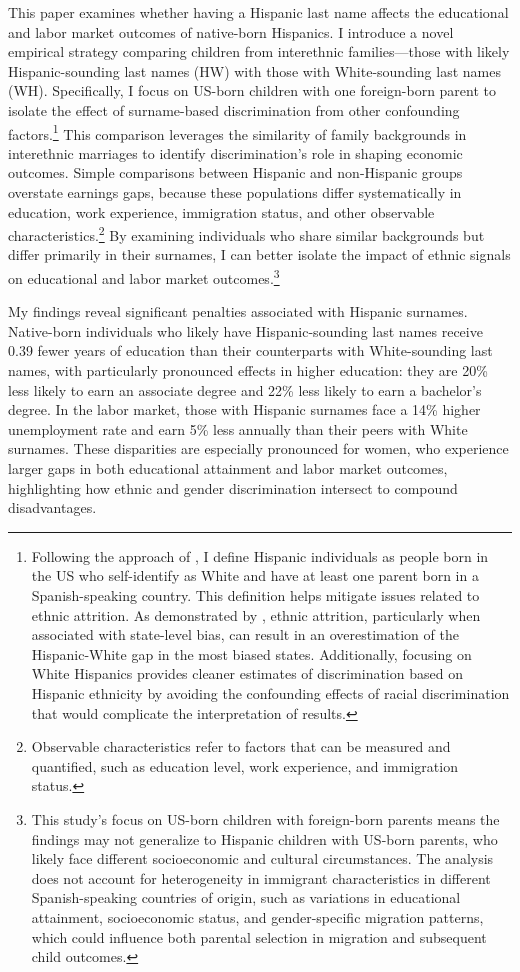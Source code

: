This paper examines whether having a Hispanic last name affects the educational and labor market outcomes of native-born Hispanics. I introduce a novel empirical strategy comparing children from interethnic families—those with likely Hispanic-sounding last names (HW) with those with White-sounding last names (WH). Specifically, I focus on US-born children with one foreign-born parent to isolate the effect of surname-based discrimination from other confounding factors.\footnote{Following the approach of \textcite{antman2020ethnic, hadah2024effect}, I define Hispanic individuals as people born in the US who self-identify as White and have at least one parent born in a Spanish-speaking country. This definition helps mitigate issues related to ethnic attrition. As demonstrated by \textcite{hadah2024effect}, ethnic attrition, particularly when associated with state-level bias, can result in an overestimation of the Hispanic-White gap in the most biased states. Additionally, focusing on White Hispanics provides cleaner estimates of discrimination based on Hispanic ethnicity by avoiding the confounding effects of racial discrimination that would complicate the interpretation of results.} This comparison leverages the similarity of family backgrounds in interethnic marriages to identify discrimination's role in shaping economic outcomes. Simple comparisons between Hispanic and non-Hispanic groups overstate earnings gaps, because these populations differ systematically in education, work experience, immigration status, and other observable characteristics.\footnote{Observable characteristics refer to factors that can be measured and quantified, such as education level, work experience, and immigration status.} By examining individuals who share similar backgrounds but differ primarily in their surnames, I can better isolate the impact of ethnic signals on educational and labor market outcomes.\footnote{This study's focus on US-born children with foreign-born parents means the findings may not generalize to Hispanic children with US-born parents, who likely face different socioeconomic and cultural circumstances. The analysis does not account for heterogeneity in immigrant characteristics in different Spanish-speaking countries of origin, such as variations in educational attainment, socioeconomic status, and gender-specific migration patterns, which could influence both parental selection in migration and subsequent child outcomes.}

My findings reveal significant penalties associated with Hispanic surnames. Native-born individuals who likely have Hispanic-sounding last names receive 0.39 fewer years of education than their counterparts with White-sounding last names, with particularly pronounced effects in higher education: they are 20\% less likely to earn an associate degree and 22\% less likely to earn a bachelor's degree. In the labor market, those with Hispanic surnames face a 14\% higher unemployment rate and earn 5\% less annually than their peers with White surnames. These disparities are especially pronounced for women, who experience larger gaps in both educational attainment and labor market outcomes, highlighting how ethnic and gender discrimination intersect to compound disadvantages.

